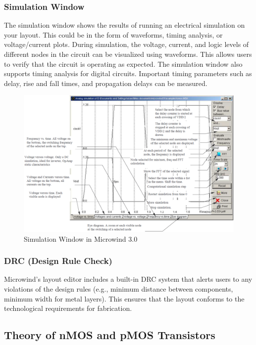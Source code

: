 \documentclass[a4paper,12pt]{article}
\begin{document}
	\subsubsection{Simulation Window}
	
	The simulation window shows the results of running an electrical simulation on your layout. This could be in the form of waveforms, timing analysis, or voltage/current plots.
	During simulation, the voltage, current, and logic levels of different nodes in the circuit can be visualized using waveforms. This allows users to verify that the circuit is operating as expected.
	The simulation window also supports timing analysis for digital circuits. Important timing parameters such as delay, rise and fall times, and propagation delays can be measured.
	\begin{figure}[H]
		\centering
		\includegraphics[width=1\linewidth]{Images/microwind/simuwindow}
		\caption{Simulation Window in Microwind 3.0}
		\label{fig:simuwindow}
	\end{figure}
	\subsubsection{DRC (Design Rule Check)}
	Microwind’s layout editor includes a built-in DRC system that alerts users to any violations of the design rules (e.g., minimum distance between components, minimum width for metal layers). This ensures that the layout conforms to the technological requirements for fabrication.
	
	\subsection{Theory of nMOS and pMOS Transistors}
	
\end{document}
